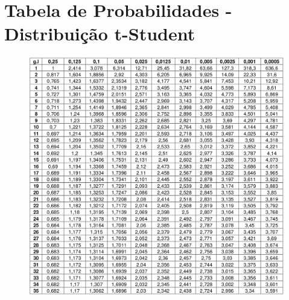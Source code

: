 \chapter{Tabela de Probabilidades - Distribuição t-Student}

\begin{figure}[h]
	\center
	\label{fig:tab-prob-t-student}
	\includegraphics[scale=1.85]{apendices/prob-t-studend.png}
\end{figure}